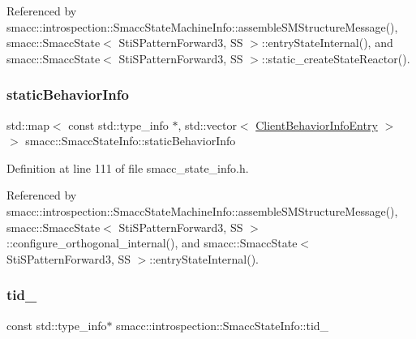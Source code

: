 Referenced by smacc\+::introspection\+::\+Smacc\+State\+Machine\+Info\+::assemble\+S\+M\+Structure\+Message(), smacc\+::\+Smacc\+State$<$ Sti\+S\+Pattern\+Forward3, S\+S $>$\+::entry\+State\+Internal(), and smacc\+::\+Smacc\+State$<$ Sti\+S\+Pattern\+Forward3, S\+S $>$\+::static\+\_\+create\+State\+Reactor().

\mbox{\label{classsmacc_1_1introspection_1_1SmaccStateInfo_ad3d8b3450060cb0b91f38fb2fe0a7678}} 
\subsubsection{\texorpdfstring{static\+Behavior\+Info}{staticBehaviorInfo}}
{\footnotesize\ttfamily std\+::map$<$ const std\+::type\+\_\+info $\ast$, std\+::vector$<$ \hyperlink{structsmacc_1_1introspection_1_1ClientBehaviorInfoEntry}{Client\+Behavior\+Info\+Entry} $>$ $>$ smacc\+::\+Smacc\+State\+Info\+::static\+Behavior\+Info\hspace{0.3cm}{\ttfamily [static]}}



Definition at line 111 of file smacc\+\_\+state\+\_\+info.\+h.



Referenced by smacc\+::introspection\+::\+Smacc\+State\+Machine\+Info\+::assemble\+S\+M\+Structure\+Message(), smacc\+::\+Smacc\+State$<$ Sti\+S\+Pattern\+Forward3, S\+S $>$\+::configure\+\_\+orthogonal\+\_\+internal(), and smacc\+::\+Smacc\+State$<$ Sti\+S\+Pattern\+Forward3, S\+S $>$\+::entry\+State\+Internal().

\mbox{\label{classsmacc_1_1introspection_1_1SmaccStateInfo_a37d0d0bce171b57b8d3a39f44ab45248}} 
\subsubsection{\texorpdfstring{tid\+\_\+}{tid\_}}
{\footnotesize\ttfamily const std\+::type\+\_\+info$\ast$ smacc\+::introspection\+::\+Smacc\+State\+Info\+::tid\+\_\+}




